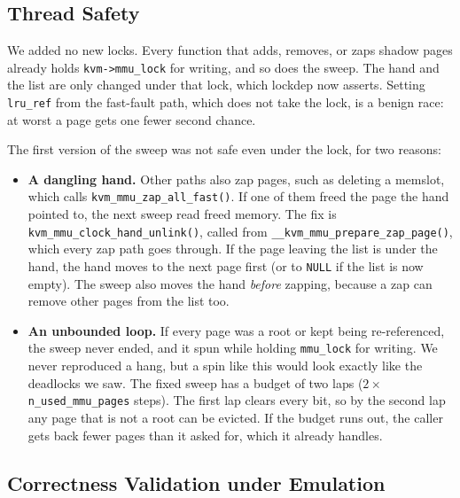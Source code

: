 \documentclass[letterpaper,twocolumn,10pt]{article}
\begin{document}
\subsection{Thread Safety}
\label{sec:impl-safety}

We added no new locks. Every function that adds, removes, or zaps shadow pages
already holds \texttt{kvm->mmu\_lock} for writing, and so does the sweep. The
hand and the list are only changed under that lock, which lockdep now asserts.
Setting \texttt{lru\_ref} from the fast-fault path, which does not take the lock,
is a benign race: at worst a page gets one fewer second chance.

The first version of the sweep was not safe even under the lock, for two
reasons:
\begin{itemize}[leftmargin=*,itemsep=2pt,topsep=2pt]
    \item \textbf{A dangling hand.} Other paths also zap pages, such as deleting
          a memslot, which calls \texttt{kvm\_mmu\_zap\_all\_fast()}. If one of them
          freed the page the hand pointed to, the next sweep read freed memory.
          The fix is \texttt{kvm\_mmu\_clock\_hand\_unlink()}, called from
          \texttt{\_\_kvm\_mmu\_prepare\_zap\_page()}, which every zap path goes
          through. If the page leaving the list is under the hand, the hand
          moves to the next page first (or to \texttt{NULL} if the list is now
          empty). The sweep also moves the hand \emph{before} zapping, because a
          zap can remove other pages from the list too.
    \item \textbf{An unbounded loop.} If every page was a root or kept being
          re-referenced, the sweep never ended, and it spun while holding
          \texttt{mmu\_lock} for writing. We never reproduced a hang, but a spin like this
would look exactly like the deadlocks we saw. The
          fixed sweep has a budget of two laps
          ($2 \times$ \texttt{n\_used\_mmu\_pages} steps). The first lap clears
          every bit, so by the second lap any page that is not a root can be
          evicted. If the budget runs out, the caller gets back fewer pages than
          it asked for, which it already handles.
\end{itemize}

\subsection{Correctness Validation under Emulation}
\label{sec:validation}
\end{document}
